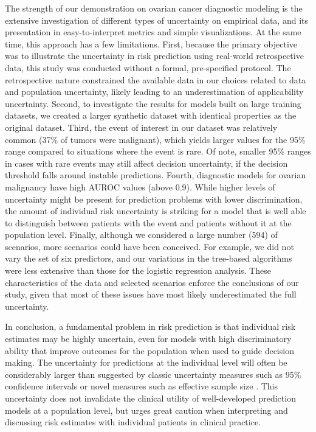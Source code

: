The strength of our demonstration on ovarian cancer diagnostic modeling is the extensive investigation of different types of uncertainty on empirical data, and its presentation in easy-to-interpret metrics and simple visualizations. At the same time, this approach has a few limitations. First,  because the primary objective was to illustrate the uncertainty in risk prediction using real-world retrospective data, this study was conducted without a formal, pre-specified protocol. The retrospective nature constrained the available data in our choices related to data and population uncertainty, likely leading to an underestimation of applicability uncertainty. Second, to investigate the results for models built on large training datasets, we created a larger synthetic dataset with identical properties as the original dataset. Third, the event of interest in our dataset was relatively common (37\% of tumors were malignant), which yields larger values for the 95\% range compared to situations where the event is rare. Of note, smaller 95\% ranges in cases with rare events may still affect decision uncertainty, if the decision threshold falls around instable predictions. Fourth, diagnostic models for ovarian malignancy have high AUROC values (above 0.9). While higher levels of uncertainty might be present for prediction problems with lower discrimination, the amount of individual risk uncertainty is striking for a model that is well able to distinguish between patients with the event and patients without it at the population level. Finally, although we considered a large number (594) of scenarios, more scenarios could have been conceived. For example, we did not vary the set of six predictors, and our variations in the tree-based algorithms were less extensive than those for the logistic regression analysis. These characteristics of the data and selected scenarios enforce the conclusions of our study, given that most of these issues have most likely underestimated the full uncertainty.

In conclusion, a fundamental problem in risk prediction is that individual risk estimates may be highly uncertain, even for models with high discriminatory ability that improve outcomes for the population when used to guide decision making. The uncertainty for predictions at the individual level will often be considerably larger than suggested by classic uncertainty measures such as 95\% confidence intervals or novel measures such as effective sample size \cite{thomassenEffectiveSampleSize2024}. This uncertainty does not invalidate the clinical utility of well-developed prediction models at a population level, but urges great caution when interpreting and discussing risk estimates with individual patients in clinical practice.



